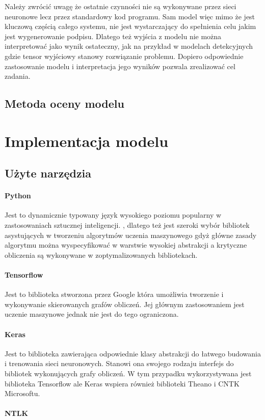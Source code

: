 Należy zwrócić uwagę że ostatnie czynności nie są wykonywane przez sieci neuronowe lecz przez standardowy kod programu. Sam model więc mimo że jest kluczową częścią całego systemu, nie jest wystarczający do spełnienia celu jakim jest wygenerowanie podpisu. Dlatego też wyjścia z modelu nie można interpretować jako wynik ostateczny, jak na przykład w modelach detekcyjnych gdzie tensor wyjściowy stanowy rozwiązanie problemu. Dopiero odpowiednie zastosowanie modelu i interpretacja jego wyników pozwala zrealizować cel zadania. 
\subsection{Metoda oceny modelu}
\section{Implementacja modelu}
\subsection{Użyte narzędzia}
\paragraph*{Python} Jest to dynamicznie typowany język wysokiego poziomu popularny w zastosowaniach sztucznej inteligencji. , dlatego też jest szeroki wybór bibliotek asystujących w tworzeniu algorytmów uczenia maszynowego gdyż główne zasady algorytmu można wyspecyfikować w warstwie wysokiej abstrakcji a krytyczne obliczenia są wykonywane w zoptymalizowanych bibliotekach.
\paragraph*{Tensorflow} Jest to biblioteka stworzona przez Google która umożliwia tworzenie i wykonywanie skierowanych grafów obliczeń. Jej głównym zastosowaniem jest uczenie maszynowe jednak nie jest do tego ograniczona.
\paragraph*{Keras} Jest to biblioteka zawierająca odpowiednie klasy abstrakcji do łatwego budowania i trenowania sieci neuronowych. Stanowi ona swojego rodzaju interfejs do bibliotek wykonujących grafy obliczeń. W tym przypadku wykorzystywana jest biblioteka Tensorflow ale Keras wspiera również biblioteki Theano i CNTK Microsoftu.
\paragraph*{NTLK} 
